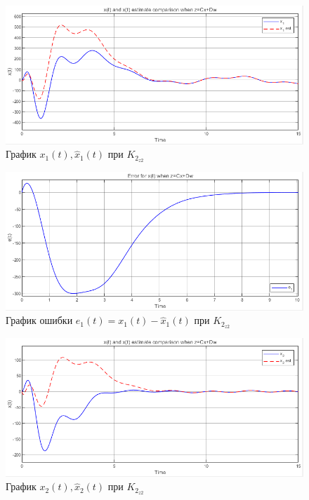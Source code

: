 \documentclass[a4paper, 12pt]{article}
\begin{document}
    \begin{figure}[H]
        \centering
        \includegraphics[scale=0.75]{3task_xxh1cd.png}
        \captionsetup{skip=0pt}
        \caption{График $x_1(t),\hat{x}_1(t)$ при $K_{2_{z2}}$}
        \label{fig:3task_xxh1cd}
    \end{figure}
    \begin{figure}[H]
        \centering
        \includegraphics[scale=0.75]{3task_xe1cd.png}
        \captionsetup{skip=0pt}
        \caption{График ошибки $e_1(t)=x_1(t)-\hat{x}_1(t)$ при $K_{2_{z2}}$}
        \label{fig:3task_xe1cd}
    \end{figure}
    \begin{figure}[H]
        \centering
        \includegraphics[scale=0.75]{3task_xxh2cd.png}
        \captionsetup{skip=0pt}
        \caption{График $x_2(t),\hat{x}_2(t)$ при $K_{2_{z2}}$}
        \label{fig:3task_xxh2cd}
    \end{figure}
\end{document}
